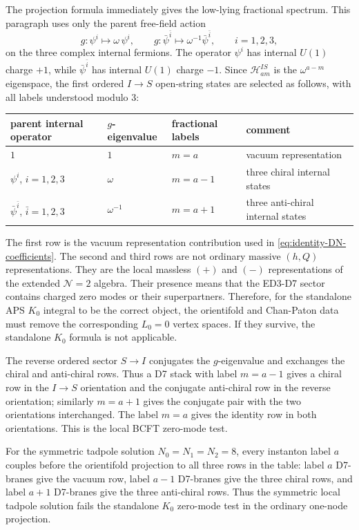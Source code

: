 \documentclass[11pt]{article}
\newcommand{\cH}{\mathcal{H}}
\begin{document}
The projection formula immediately gives the low-lying fractional spectrum. This paragraph uses
only the parent free-field action
\begin{equation}
  g:\psi^i\mapsto\omega\,\psi^i,
  \qquad
  g:\bar\psi^{\bar i}\mapsto\omega^{-1}\bar\psi^{\bar i},
  \qquad
  i=1,2,3,
  \label{eq:fermion-orbifold-action}
\end{equation}
on the three complex internal fermions. The operator $\psi^i$ has internal $U(1)$ charge $+1$,
while $\bar\psi^{\bar i}$ has internal $U(1)$ charge $-1$. Since
$\cH_{a m}^{IS}$ is the $\omega^{a-m}$ eigenspace, the first ordered $I\to S$ open-string
states are selected as follows, with all labels understood modulo $3$:
\begin{center}
\begin{tabular}{@{}llll@{}}
\toprule
parent internal operator & $g$-eigenvalue & fractional labels & comment \\
\midrule
$1$ & $1$ & $m=a$ & vacuum representation \\
$\psi^i$, $i=1,2,3$ & $\omega$ & $m=a-1$ & three chiral internal states \\
$\bar\psi^{\bar i}$, $\bar i=1,2,3$ & $\omega^{-1}$ & $m=a+1$ & three anti-chiral internal states \\
\bottomrule
\end{tabular}
\end{center}
The first row is the vacuum representation contribution used in
\eqref{eq:identity-DN-coefficients}. The second and third rows are not ordinary massive
$(h,Q)$ representations. They are the local massless $(+)$ and $(-)$ representations of the
extended $\mathcal N=2$ algebra. Their presence means that the ED3-D7 sector contains charged
zero modes or their superpartners. Therefore, for the standalone APS \(K_0\) integral to be the
correct object, the orientifold and Chan-Paton data must remove the corresponding \(L_0=0\)
vertex spaces. If they survive, the standalone \(K_0\) formula is not applicable.

The reverse ordered sector $S\to I$ conjugates the $g$-eigenvalue and exchanges the chiral and
anti-chiral rows. Thus a D7 stack with label $m=a-1$ gives a chiral row in the $I\to S$
orientation and the conjugate anti-chiral row in the reverse orientation; similarly $m=a+1$
gives the conjugate pair with the two orientations interchanged. The label $m=a$ gives the
identity row in both orientations. This is the local BCFT zero-mode test.

For the symmetric tadpole solution $N_0=N_1=N_2=8$, every instanton label $a$ couples before
the orientifold projection to all three rows in the table: label $a$ D7-branes give the vacuum
row, label $a-1$ D7-branes give the three chiral rows, and label $a+1$ D7-branes give the three
anti-chiral rows. Thus the symmetric local tadpole solution fails the standalone \(K_0\)
zero-mode test in the ordinary one-node projection.
\end{document}
